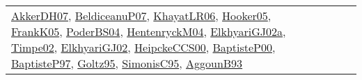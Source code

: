 {\begin{longtable}{lp{3cm}>{\raggedright}p{6cm}>{\raggedright}p{6cm}p{8cm}}
\href{papers/AkkerDH07.pdf}{AkkerDH07}\cite{AkkerDH07}, \href{papers/BeldiceanuP07.pdf}{BeldiceanuP07}\cite{BeldiceanuP07}, \href{articles/KhayatLR06.pdf}{KhayatLR06}\cite{KhayatLR06}, \href{articles/Hooker05.pdf}{Hooker05}\cite{Hooker05}, \href{papers/FrankK05.pdf}{FrankK05}\cite{FrankK05}, \href{articles/PoderBS04.pdf}{PoderBS04}\cite{PoderBS04}, \href{papers/HentenryckM04.pdf}{HentenryckM04}\cite{HentenryckM04}, \href{papers/ElkhyariGJ02a.pdf}{ElkhyariGJ02a}\cite{ElkhyariGJ02a}, \href{articles/Timpe02.pdf}{Timpe02}\cite{Timpe02}, \href{papers/ElkhyariGJ02.pdf}{ElkhyariGJ02}\cite{ElkhyariGJ02}, \href{articles/HeipckeCCS00.pdf}{HeipckeCCS00}\cite{HeipckeCCS00}, \href{articles/BaptisteP00.pdf}{BaptisteP00}\cite{BaptisteP00}, \href{papers/BaptisteP97.pdf}{BaptisteP97}\cite{BaptisteP97}, \href{papers/Goltz95.pdf}{Goltz95}\cite{Goltz95}, \href{papers/SimonisC95.pdf}{SimonisC95}\cite{SimonisC95}, \href{articles/AggounB93.pdf}{AggounB93}\cite{AggounB93}\\

\end{longtable}}

